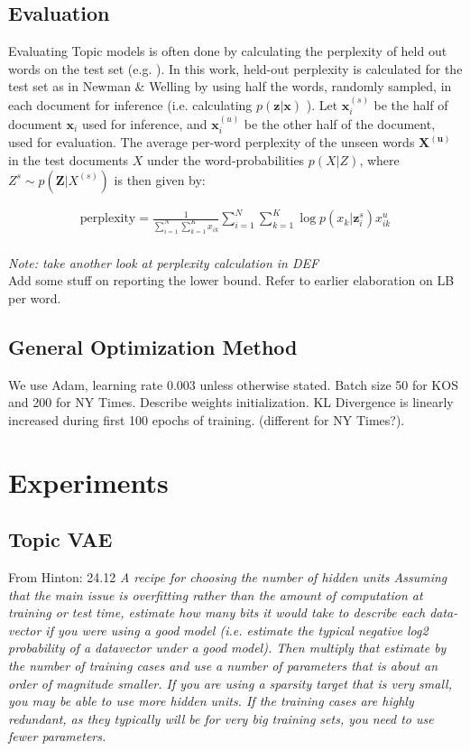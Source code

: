 \documentclass{report}
\begin{document}
	\subsection{Evaluation}
	
	Evaluating Topic models is often done by calculating the perplexity of held out words on the test set (e.g. \cite{blei2003latent, newman2007distributed, ranganath2015deep}). In this work, held-out perplexity is calculated for the test set as in Newman \& Welling \cite{newman2007distributed} by using half the words, randomly sampled, in each document for inference (i.e. calculating $p(\mathbf{z}|\mathbf{x})$ ). Let $\mathbf{x}_{i}^{(s)}$ be the half of document $\mathbf{x}_i$ used for inference, and $\mathbf{x}_{i}^{(u)}$ be the other half of the document, used for evaluation. The average per-word perplexity of the unseen words $\mathbf{X^{(u)}}$ in the test documents $X$ under the word-probabilities $p(X|Z)$, where $Z^s \sim p(\mathbf{Z}|X^{(s)})$ is then given by:
	
	
	\begin{align}
	\text{perplexity} =  \frac{1}{\sum\limits_{i=1}^{N}\sum\limits_{k=1}^{K}x_{ik}}\sum\limits_{i=1}^N\sum\limits_{k=1}^{K} \log p(x_{k}|\mathbf{z}_{i}^{s})x_{ik}^{u}
	\end{align}\\
	\textit{Note: take another look at perplexity calculation in DEF}
	\\
	Add some stuff on reporting the lower bound. Refer to earlier elaboration on LB per word.
	
	\subsection{General Optimization Method}\label{optim_section}
	We use Adam, learning rate 0.003 unless otherwise stated. Batch size 50 for KOS and 200 for NY Times. Describe weights initialization. KL Divergence is linearly increased during first 100 epochs of training. (different for NY Times?).
	

	\section{Experiments}
	\subsection{Topic VAE}
	
	From Hinton: 24.12 \textit{A recipe for choosing the number of hidden units
		Assuming that the main issue is overfitting rather than the amount of computation at training or
		test time, estimate how many bits it would take to describe each data-vector if you were using a good
		model (i.e. estimate the typical negative log2 probability of a datavector under a good model). Then
		multiply that estimate by the number of training cases and use a number of parameters that is about
		an order of magnitude smaller. If you are using a sparsity target that is very small, you may be able
		to use more hidden units. If the training cases are highly redundant, as they typically will be for very
		big training sets, you need to use fewer parameters.}\\
\end{document}
